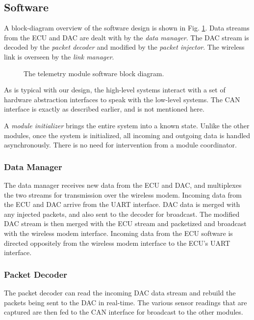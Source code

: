 \subsection{Software}
	
A block-diagram overview of the software design is shown in Fig. \ref{fig:telemetry_software_design_block}. Data streams from the ECU and DAC are dealt with by the \emph{data manager}. The DAC stream is decoded by the \emph{packet decoder} and modified by the \emph{packet injector}. The wireless link is overseen by the \emph{link manager}. 

\begin{figure}[H]
	\centering
%	
	\caption{The telemetry module software block diagram.}
	\label{fig:telemetry_software_design_block}
\end{figure}

As is typical with our design, the high-level systems interact with a set of hardware abstraction interfaces to speak with the low-level systems. The CAN interface is exactly as described earlier, and is not mentioned here.

A \emph{module initializer} brings the entire system into a known state. Unlike the other modules, once the system is initialized, all incoming and outgoing data is handled asynchronously. There is no need for intervention from a module coordinator. 

\subsubsection{Data Manager}

The data manager receives new data from the ECU and DAC, and multiplexes the two streams for transmission over the wireless modem. Incoming data from the ECU and DAC arrive from the UART interface. DAC data is merged with any injected packets, and also sent to the decoder for broadcast. The modified DAC stream is then merged with the ECU stream and packetized and broadcast with the wireless modem interface. Incoming data from the ECU software is directed oppositely from the wireless modem interface to the ECU's UART interface.

\subsubsection{Packet Decoder}

The packet decoder can read the incoming DAC data stream and rebuild the packets being sent to the DAC in real-time. The various sensor readings that are captured are then fed to the CAN interface for broadcast to the other modules.

